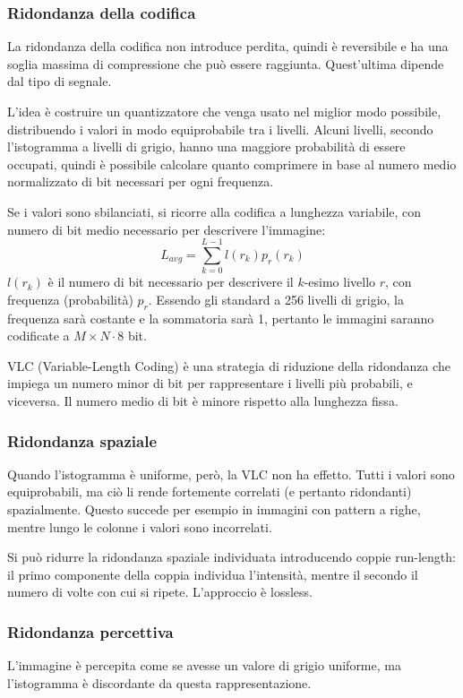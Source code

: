 \subsubsection{Ridondanza della codifica}
La ridondanza della codifica non introduce perdita, quindi è reversibile e ha una soglia massima di compressione che può essere raggiunta. Quest'ultima dipende dal tipo di segnale.

L'idea è costruire un quantizzatore che venga usato nel miglior modo possibile, distribuendo i valori in modo equiprobabile tra i livelli. Alcuni livelli, secondo l'istogramma a livelli di grigio, hanno una maggiore probabilità di essere occupati, quindi è possibile calcolare quanto comprimere in base al numero medio normalizzato di bit necessari per ogni frequenza.

Se i valori sono sbilanciati, si ricorre alla codifica a lunghezza variabile, con numero di bit medio necessario per descrivere l'immagine:
$$L_{avg} = \sum_{k=0}^{L-1}l(r_k)p_r(r_k)$$
$l(r_k)$ è il numero di bit necessario per descrivere il $k$-esimo livello $r$, con frequenza (probabilità) $p_r$. Essendo gli standard a 256 livelli di grigio, la frequenza sarà costante e la sommatoria sarà 1, pertanto le immagini saranno codificate a $M\times N \cdot 8$ bit.

VLC (Variable-Length Coding) è una strategia di riduzione della ridondanza che impiega un numero minor di bit per rappresentare i livelli più probabili, e viceversa. Il numero medio di bit è minore rispetto alla lunghezza fissa.

\subsubsection{Ridondanza spaziale}
Quando l'istogramma è uniforme, però, la VLC non ha effetto. Tutti i valori sono equiprobabili, ma ciò li rende fortemente correlati (e pertanto ridondanti) spazialmente. Questo succede per esempio in immagini con pattern a righe, mentre lungo le colonne i valori sono incorrelati.

Si può ridurre la ridondanza spaziale individuata introducendo coppie run-length: il primo componente della coppia individua l'intensità, mentre il secondo il numero di volte con cui si ripete. L'approccio è lossless.

\subsubsection{Ridondanza percettiva}
L'immagine è percepita come se avesse un valore di grigio uniforme, ma l'istogramma è discordante da questa rappresentazione.

